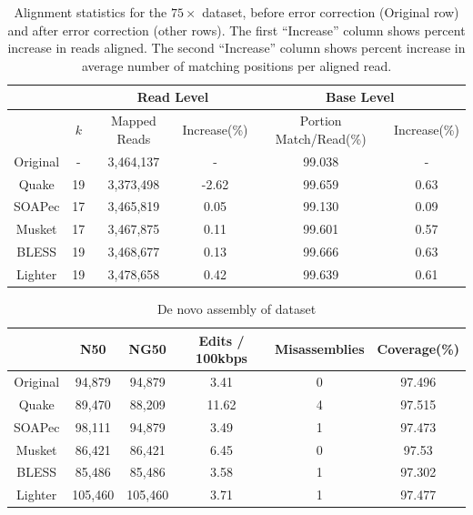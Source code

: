 \documentclass{bmcart}
\begin{document}
\begin{backmatter}
\begin{table}[h!] %
\caption{Alignment statistics for the $75\times$ \ecoli dataset, before error correction (Original row) and after error correction (other rows).  The first ``Increase'' column shows percent increase in reads aligned.  The second ``Increase'' column shows percent increase in average number of matching positions per aligned read.}
\begin{tabular}{|c|c|c|c||c|c|} \hline
	 & & \multicolumn{2}{|c||}{Read Level} & \multicolumn{2}{|c|}{Base Level} \\ \hline
     & $k$ & Mapped Reads & Increase(\%) & Portion Match/Read(\%) & Increase(\%) \\ \hline
Original & - & 	3,464,137	 & - &  99.038 & - \\ \hline
Quake	& 19 & 3,373,498	& -2.62	& 99.659  & 0.63 \\ \hline
SOAPec  & 17 & 3,465,819 & 0.05 & 99.130 & 0.09 \\ \hline
Musket	& 17 & 3,467,875	& 0.11	& 99.601 & 0.57 \\ \hline
BLESS	& 19 & 3,468,677& 0.13	& 99.666  & 0.63 \\ \hline
Lighter	& 19 &  3,478,658	& 0.42	& 99.639  & 0.61 \\ \hline
\end{tabular}
\end{table}

\begin{table}[h!] %
\caption{De novo assembly of \ecoli dataset}
\begin{tabular}{|c|c|c|c|c|c|} \hline
	 	& N50 &	NG50	 & Edits / 100kbps&	Misassemblies	& Coverage(\%) \\ \hline
Original &	94,879 &	94,879	& 3.41	& 0	& 97.496  \\ \hline
Quake	& 89,470 &	88,209	& 11.62	& 4	 & 97.515  \\ \hline
SOAPec	& 98,111 &	94,879	& 3.49	& 1	& 97.473	\\ \hline
Musket	& 86,421  &	86,421	& 6.45	& 0	 & 97.53 \\ \hline
BLESS	& 85,486  &	85,486	& 3.58	& 1	& 97.302  \\ \hline
Lighter	& 105,460 &	105,460	& 3.71	& 1	& 97.477  \\ \hline
\end{tabular}
\end{table}



\end{backmatter}
\end{document}
